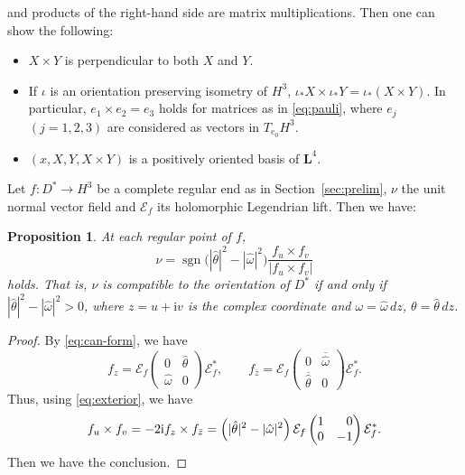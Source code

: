 \documentclass[a4paper]{amsart}
\theoremstyle{plain}
\newtheorem{proposition}[theorem]{Proposition}
\theoremstyle{remark}
\numberwithin{equation}{section}
\begin{document}
and products of the right-hand side are matrix multiplications.
Then one can show the following:
\begin{itemize}
  \item $X\times Y$ is perpendicular to both $X$ and $Y$.
  \item If $\iota$ is an orientation preserving isometry of $H^3$,
	$\iota_*X\times \iota_*Y=\iota_*(X\times Y)$.
	In particular, $e_1\times e_2=e_3$ holds  for matrices as in
	\eqref{eq:pauli},
	where $e_j$ $(j=1,2,3)$ are considered as vectors in 
	$T_{e_0}H^3$.
  \item $(x,X,Y,X\times Y)$ is a positively oriented basis of
	${\boldsymbol{L}}^4$.
\end{itemize}

Let $f\colon{}D^*\to H^3$ be a complete regular end as in
Section~\ref{sec:prelim}, $\nu$ the unit
normal vector field and  ${\mathcal{E}}_f$ its holomorphic Legendrian lift.
Then we have: 
\begin{proposition}\label{eq:orientation-normal}
At each regular point of $f$,
 \[
     \nu = {\operatorname{sgn}}\bigl(|\hat\theta|^2-|\hat\omega|^2\bigr) 
     \frac{f_u\times f_v}{|f_u\times f_v|}
 \]
  holds.
  That is, $\nu$ is compatible to the orientation of $D^*$
  if and only if $|\hat\theta|^2-|\hat\omega|^2>0$,
  where $z=u+{\mathrm{i}} v$ is the complex coordinate and 
  $\omega=\hat\omega\,dz$, $\theta=\hat\theta\,dz$.
\end{proposition}
\begin{proof}
 By \eqref{eq:can-form}, we have
 \[
    f_z = {\mathcal{E}}_f\begin{pmatrix}
	      0 & \hat\theta \\
	     \hat\omega & 0 
	   \end{pmatrix}{\mathcal{E}}_f^*,\qquad
    f_{\bar z} = {\mathcal{E}}_f\begin{pmatrix}
	      0 & \overline{\hat\omega} \\
	     \overline{\hat\theta} & 0 
	   \end{pmatrix}{\mathcal{E}}_f^*.
 \]
 Thus, using \eqref{eq:exterior}, we have
 \begin{equation*}
   f_u\times f_v = -2 {\mathrm{i}} f_z\times f_{\bar z}
       =
      \left(|\hat\theta|^2-|\hat\omega|^2\right)
               {\mathcal{E}}_f\begin{pmatrix}1 &\hphantom{-}0 \\ 0 & -1\end{pmatrix}{\mathcal{E}}_f^*.
   \end{equation*}
   Then we have the conclusion.
\end{proof}
\end{document}
